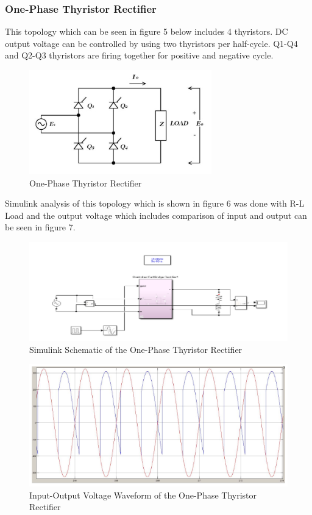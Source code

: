 \documentclass{article}
\begin{document}
\subsubsection{One-Phase Thyristor Rectifier}%
This topology which can be seen in figure 5 below includes 4 thyristors. DC output voltage can be controlled by using two thyristors per half-cycle. Q1-Q4 and Q2-Q3 thyristors are firing together for positive and negative cycle.  
\begin{figure}[h!]
\centering
\includegraphics[scale=0.55]{birfazthytopo}
\caption{One-Phase Thyristor Rectifier}
\label{fig:members}
\end{figure} 
\par Simulink analysis of this topology which is shown in figure 6 was done with R-L Load and the output voltage which includes comparison of input and output can be seen in figure 7.

\begin{figure}[h!]
\centering
\includegraphics[scale=0.75]{birfazthycct}
\caption{Simulink Schematic of the One-Phase Thyristor Rectifier}
\label{fig:members}
\end{figure} 

\begin{figure}[h!]
\centering
\includegraphics[scale=0.55]{birfazthyvoltage}
\caption{Input-Output Voltage Waveform of the One-Phase Thyristor Rectifier}
\label{fig:members}
\end{figure} 
\end{document}
